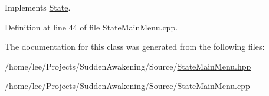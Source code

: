 Implements \hyperlink{class_state_a43d4ca30d927c023316c058b700c0716}{State}.



Definition at line 44 of file State\-Main\-Menu.\-cpp.



The documentation for this class was generated from the following files\-:\begin{DoxyCompactItemize}
\item 
/home/lee/\-Projects/\-Sudden\-Awakening/\-Source/\hyperlink{_state_main_menu_8hpp}{State\-Main\-Menu.\-hpp}\item 
/home/lee/\-Projects/\-Sudden\-Awakening/\-Source/\hyperlink{_state_main_menu_8cpp}{State\-Main\-Menu.\-cpp}\end{DoxyCompactItemize}

